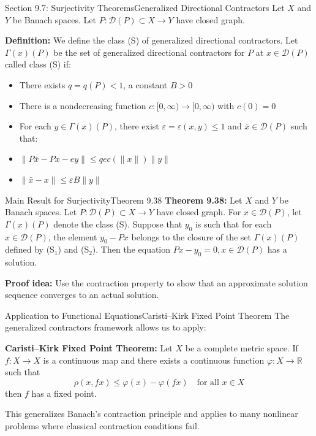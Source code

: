 \documentclass[aspectratio=169,10pt]{beamer}
\begin{document}
\begin{frame}{Section 9.7: Surjectivity Theorems}{Generalized Directional Contractors}
Let $X$ and $Y$ be Banach spaces. Let $P : \mathcal{D}(P) \subset X \to Y$ have closed graph.

\medskip

\textbf{Definition:} We define the class (S) of generalized directional contractors. Let $\Gamma(x)(P)$ be the set of generalized directional contractors for $P$ at $x \in \mathcal{D}(P)$ called class (S) if:
\begin{itemize}
    \item There exists $q = q(P) < 1$, a constant $B > 0$
    \item There is a nondecreasing function $c : [0, \infty) \to [0, \infty)$ with $c(0) = 0$
    \item For each $y \in \Gamma(x)(P)$, there exist $\varepsilon = \varepsilon(x, y) \leq 1$ and $\bar{x} \in \mathcal{D}(P)$ such that:
\end{itemize}

\medskip
\begin{itemize}
    \item[\textbf{(S}_1\textbf{)}] $\|P\bar{x} - Px - ey\| \leq qec(\|x\|)\|y\|$
    \item[\textbf{(S}_2\textbf{)}] $\|\bar{x} - x\| \leq \varepsilon B\|y\|$
\end{itemize}
\end{frame}

\begin{frame}{Main Result for Surjectivity}{Theorem 9.38}
\textbf{Theorem 9.38:} Let $X$ and $Y$ be Banach spaces. Let $P : \mathcal{D}(P) \subset X \to Y$ have closed graph. For $x \in \mathcal{D}(P)$, let $\Gamma(x)(P)$ denote the class (S). Suppose that $y_0$ is such that for each $x \in \mathcal{D}(P)$, the element $y_0 - Px$ belongs to the closure of the set $\Gamma(x)(P)$ defined by (S$_1$) and (S$_2$). Then the equation $Px - y_0 = 0, x \in \mathcal{D}(P)$ has a solution.

\medskip

\textbf{Proof idea:} Use the contraction property to show that an approximate solution sequence converges to an actual solution.
\end{frame}

\begin{frame}{Application to Functional Equations}{Caristi--Kirk Fixed Point Theorem}
The generalized contractors framework allows us to apply:

\medskip
\textbf{Caristi--Kirk Fixed Point Theorem:} Let $X$ be a complete metric space. If $f : X \to X$ is a continuous map and there exists a continuous function $\varphi : X \to \mathbb{R}$ such that
\[
\rho(x, fx) \leq \varphi(x) - \varphi(fx) \quad \text{for all } x \in X
\]
then $f$ has a fixed point.

\medskip

This generalizes Banach's contraction principle and applies to many nonlinear problems where classical contraction conditions fail.
\end{frame}
\end{document}
